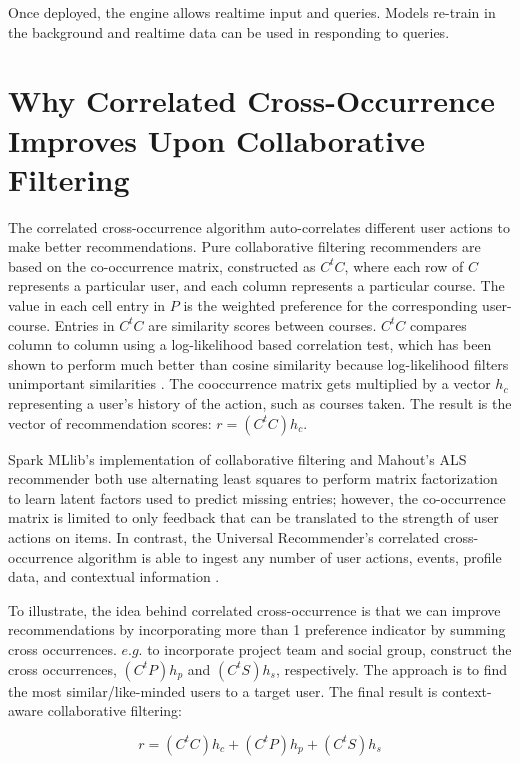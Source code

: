 \documentclass[12pt,journal]{IEEEtran}
\begin{document}
Once deployed, the engine allows realtime input and queries.  Models re-train in the background and realtime data can be used in responding to queries.

\section{Why Correlated Cross-Occurrence Improves Upon Collaborative Filtering}

The correlated cross-occurrence algorithm auto-correlates different user actions to make better recommendations.  Pure collaborative filtering recommenders are based on the co-occurrence matrix, constructed as $C^tC$, where each row of $C$ represents a particular user, and each column represents a particular course.  The value in each cell entry in $P$ is the weighted preference for the corresponding user-course.  Entries in $C^tC$ are similarity scores between courses.  $C^tC$ compares column to column using a log-likelihood based correlation test, which has been shown to perform much better than cosine similarity because log-likelihood filters unimportant similarities \cite{patferrel}.  The cooccurrence matrix gets multiplied by a vector $h_c$ representing a user's history of the action, such as courses taken.  The result is the vector of recommendation scores: $r = (C^tC)h_c$.

Spark MLlib's implementation of collaborative filtering and Mahout's ALS recommender both use alternating least squares to perform matrix factorization to learn latent factors used to predict missing entries; however, the co-occurrence matrix is limited to only feedback that can be translated to the strength of user actions on items.  In contrast, the Universal Recommender's correlated cross-occurrence algorithm is able to ingest any number of user actions, events, profile data, and contextual information \cite{UniversalRecommender}.

To illustrate, the idea behind correlated cross-occurrence is that we can improve recommendations by incorporating more than 1 preference indicator by summing cross occurrences.  $e.g.$ to incorporate project team and social group, construct the cross occurrences, $(C^tP)h_p$ and $(C^tS)h_s$, respectively.  The approach is to find the most similar/like-minded users to a target user.  The final result is context-aware collaborative filtering: 

\begin{equation}
    r = (C^tC)h_c + (C^tP)h_p + (C^tS)h_s
\end{equation}
\end{document}
